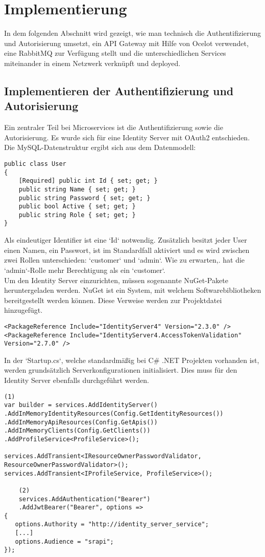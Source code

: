 \section{Implementierung}
In dem folgenden Abschnitt wird gezeigt, wie man technisch die Authentifizierung und Autorisierung umsetzt, ein API Gateway mit Hilfe von Ocelot verwendet, eine RabbitMQ zur Verfügung stellt und die unterschiedlichen Services miteinander in einem Netzwerk verknüpft und deployed.  

\subsection{Implementieren der Authentifizierung und Autorisierung}
Ein zentraler Teil bei Microservices ist die Authentifizierung sowie die Autorisierung. Es wurde sich für eine Identity Server mit OAuth2 entschieden. Die MySQL-Datenstruktur ergibt sich aus dem Datenmodell:

\begin{verbatim}
public class User
{
    [Required] public int Id { set; get; }
    public string Name { set; get; }
    public string Password { set; get; }
    public bool Active { set; get; }
    public string Role { set; get; }
}
\end{verbatim}

Als eindeutiger Identifier ist eine `Id` notwendig. Zusätzlich besitzt jeder User einen Namen, ein Passwort, ist im Standardfall aktiviert und es wird zwischen zwei Rollen unterschieden: `customer` und  `admin`. Wie zu erwarten,. hat die `admin`-Rolle mehr Berechtigung als ein `customer`. \\

Um den Identity Server einzurichten, müssen sogenannte NuGet-Pakete heruntergeladen werden. NuGet ist ein System, mit welchem Softwarebibliotheken bereitgestellt werden können. Diese Verweise werden zur Projektdatei hinzugefügt.

\begin{verbatim}
<PackageReference Include="IdentityServer4" Version="2.3.0" />
<PackageReference Include="IdentityServer4.AccessTokenValidation" Version="2.7.0" />
\end{verbatim}

In der `Startup.cs`, welche standardmäßig bei C\# .NET Projekten vorhanden ist, werden grundsätzlich Serverkonfigurationen initialisiert. Dies muss für den Identity Server ebenfalls durchgeführt werden.

\begin{verbatim}
(1)
var builder = services.AddIdentityServer()
.AddInMemoryIdentityResources(Config.GetIdentityResources()) 
.AddInMemoryApiResources(Config.GetApis())
.AddInMemoryClients(Config.GetClients())
.AddProfileService<ProfileService>();

services.AddTransient<IResourceOwnerPasswordValidator, ResourceOwnerPasswordValidator>();
services.AddTransient<IProfileService, ProfileService>();
	
	(2)
	services.AddAuthentication("Bearer")
	.AddJwtBearer("Bearer", options =>
{
   options.Authority = "http://identity_server_service";
   [...]
   options.Audience = "srapi";
});
\end{verbatim}  

